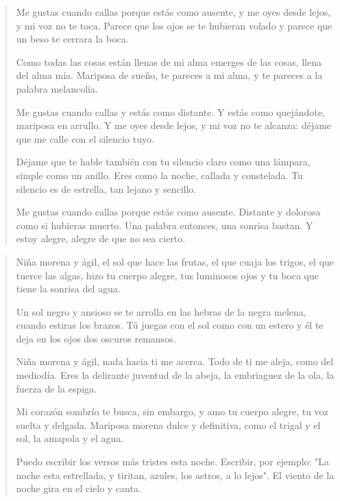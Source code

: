 \documentclass[12pt]{article}
\begin{document}
\clearpage
{}
\begin{verse}
Me gustas cuando callas porque estás como ausente,  
y me oyes desde lejos, y mi voz no te toca.  
Parece que los ojos se te hubieran volado  
y parece que un beso te cerrara la boca.  
	
Como todas las cosas están llenas de mi alma  
emerges de las cosas, llena del alma mía.  
Mariposa de sueño, te pareces a mi alma,  
y te pareces a la palabra melancolía.  
	
Me gustas cuando callas y estás como distante.  
Y estás como quejándote, mariposa en arrullo.  
Y me oyes desde lejos, y mi voz no te alcanza:  
déjame que me calle con el silencio tuyo.  
	
Déjame que te hable también con tu silencio  
claro como una lámpara, simple como un anillo.  
Eres como la noche, callada y constelada.  
Tu silencio es de estrella, tan lejano y sencillo.  
	
Me gustas cuando callas porque estás como ausente.  
Distante y dolorosa como si hubieras muerto.  
Una palabra entonces, una sonrisa bastan.  
Y estoy alegre, alegre de que no sea cierto.

\end{verse}

\clearpage
{}
\begin{verse}
Niña morena y ágil, el sol que hace las frutas,  
el que cuaja los trigos, el que tuerce las algas,  
hizo tu cuerpo alegre, tus luminosos ojos  
y tu boca que tiene la sonrisa del agua.  
	
Un sol negro y ansioso se te arrolla en las hebras  
de la negra melena, cuando estiras los brazos.  
Tú juegas con el sol como con un estero  
y él te deja en los ojos dos oscuros remansos.  
	
Niña morena y ágil, nada hacia ti me acerca.  
Todo de ti me aleja, como del mediodía.  
Eres la delirante juventud de la abeja,  
la embriaguez de la ola, la fuerza de la espiga.  
	
Mi corazón sombrío te busca, sin embargo,  
y amo tu cuerpo alegre, tu voz suelta y delgada.  
Mariposa morena dulce y definitiva,  
como el trigal y el sol, la amapola y el agua.  
	 
Puedo escribir los versos más tristes esta noche.  
Escribir, por ejemplo: "La noche esta estrellada,  
y tiritan, azules, los astros, a lo lejos".  
El viento de la noche gira en el cielo y canta.

\end{verse}
\end{document}

